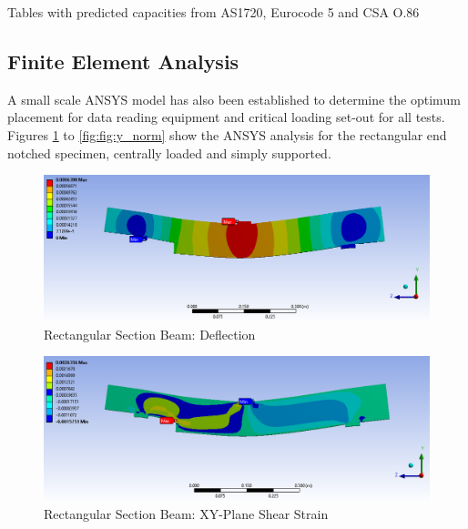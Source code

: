 \documentclass[11pt,a4paper]{article}
\numberwithin{equation}{subsection}
\begin{document}
\vspace*{\baselineskip}
\noindent Tables with predicted capacities from AS1720, Eurocode 5 and CSA O.86\par

\subsection{Finite Element Analysis}
\noindent
A small scale ANSYS model has also been established to determine the optimum placement for data reading equipment and critical loading set-out for all tests. Figures \ref{fig:Def} to \ref{fig:fig:y_norm} show the ANSYS analysis for the rectangular end notched specimen, centrally loaded and simply supported.

\vspace*{\baselineskip}

\begin{figure}[h]
	\begin{center}
		\includegraphics[scale=0.45]{Ansys_Deflection}
	\end{center}
	
	\caption{Rectangular Section Beam: Deflection}
	\label{fig:Def}
\end{figure}
\pagebreak

\begin{figure}[h]
	\begin{center}
		\includegraphics[scale=0.45]{YZ_shear_strain}
	\end{center}
	\caption{Rectangular Section Beam: XY-Plane Shear Strain}
	\label{fig:yz_shear}
\end{figure}
\end{document}
